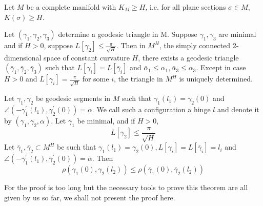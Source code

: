 \documentclass{ctexart}
\begin{document}
Let $M$ be a complete manifold with $K_M \geq H$, i.e. for all plane sections $\sigma\in M$, $K(\sigma)\geq H$.
\begin{theorem}
  Let $\left(\gamma_1, \gamma_2, \gamma_3\right)$ determine a geodesic triangle in M. Suppose $\gamma_1, \gamma_3$ are minimal and if $H>0$, suppose $L\left[\gamma_2\right] \leq \frac{\pi}{\sqrt{H}}$. 
  Then in $M^H$, the simply connected 2-dimensional space of constant curvature $H$, there exists a geodesic triangle $\left(\bar{\gamma}_1, \bar{\gamma}_2, \bar{\gamma}_3\right)$ 
  such that $L\left[\gamma_i\right]=L\left[\bar{\gamma}_i\right]$ and $\bar{\alpha}_1 \leq \alpha_1, \bar{\alpha}_3 \leq \alpha_3$. 
  Except in case $H>0$ and $L\left[\gamma_i\right]=\frac{\pi}{\sqrt{H}}$ for some $i$, the triangle in $M^H$ is uniquely determined.
\end{theorem}
\begin{theorem}
  Let $\gamma_1, \gamma_2$ be geodesic segments in $M$ such that $\gamma_1\left(l_1\right)=\gamma_2(0)$ and $\angle\left(-\gamma_1^{\prime}\left(l_1\right), \gamma_2^{\prime}(0)\right)=\alpha$. 
  We call such a configuration a hinge $l$ and denote it by $\left(\gamma_1, \gamma_2, \alpha\right)$. Let $\gamma_1$ be minimal, and if $H>0$,
  $$
  L\left[\gamma_2\right] \leq \frac{\pi}{\sqrt{H}}
  $$
  Let $\bar{\gamma}_1, \bar{\gamma}_2 \subset M^H$ be such that $\gamma_1\left(l_1\right)=\gamma_2(0), L\left[\gamma_i\right]=L\left[\bar{\gamma}_i\right]=l_i$ and 
  $\angle\left(-\bar{\gamma}_1^{\prime}\left(l_1\right), \bar{\gamma}_2^{\prime}(0)\right)=\alpha$. Then
  $$
  \rho\left(\gamma_1(0), \gamma_2\left(l_2\right)\right) \leq \rho\left(\bar{\gamma}_1(0), \bar{\gamma}_2\left(l_2\right)\right)
  $$    
\end{theorem}
For the proof is too long but the necessary tools to prove this theorem are all given by us so far, we shall not present the proof here. 






\end{document}
